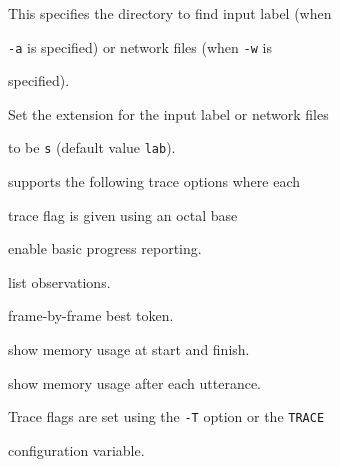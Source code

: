 \begin{optlist}
   This specifies the directory to find input label (when


        \texttt{-a} is specified) or network files (when \texttt{-w} is


        specified).





   Set the extension for the input label or network files 


        to be \texttt{s}  (default value \texttt{lab}).





\stdoptE


\stdoptG


\stdoptH


\stdoptI


\stdoptJ


\stdoptK


\stdoptP





\end{optlist}












 supports the following trace options where each


trace flag is given using an octal base


\begin{optlist}


    enable basic progress reporting.  


    list observations.


    frame-by-frame best token.


    show memory usage at start and finish.


    show memory usage after each utterance.


\end{optlist}


Trace flags are set using the \texttt{-T} option or the \texttt{TRACE} 


configuration variable.


















